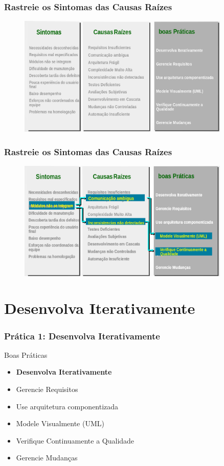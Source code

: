 \begin{frame}
 \frametitle{Rastreie os Sintomas das Causas Raízes}
  \begin{figure}
   \centering
   \includegraphics[width = 0.9\textwidth]{figs/fig5.png}
  \end{figure}
\end{frame}

\begin{frame}
 \frametitle{Rastreie os Sintomas das Causas Raízes}
  \begin{figure}
   \centering
   \includegraphics[width = 0.9\textwidth]{figs/fig6.png}
  \end{figure}
\end{frame}
\section{Desenvolva Iterativamente}
\begin{frame}
 \frametitle{Prática 1: Desenvolva Iterativamente}
 \begin{block}{Boas Práticas}
 \begin{itemize}
  \item \textbf{Desenvolva Iterativamente}
  \item Gerencie Requisitos
  \item Use arquitetura componentizada
  \item  Modele Visualmente (UML)
  \item  Verifique Continuamente a Qualidade
  \item Gerencie Mudanças  
 \end{itemize}
\end{block}
\end{frame}

